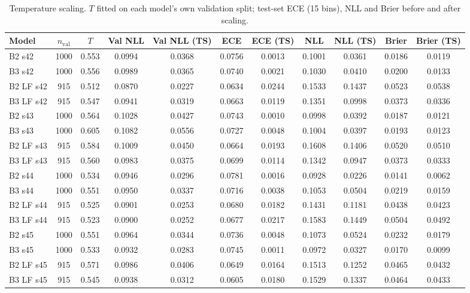 \begin{table}[!ht]
\centering
\scriptsize
\caption{Temperature scaling. $T$ fitted on each model's own validation split; test-set ECE (15 bins), NLL and Brier before and after scaling.}
\label{tab:s-calib}
\begin{tabular}{lcccccccccc}
\toprule
Model & $n_{\text{val}}$ & $T$ & Val NLL & Val NLL (TS) & ECE & ECE (TS) & NLL & NLL (TS) & Brier & Brier (TS) \\
\midrule
B2 s42 & 1000 & 0.553 & 0.0994 & 0.0368 & 0.0756 & 0.0013 & 0.1001 & 0.0361 & 0.0186 & 0.0119 \\
B3 s42 & 1000 & 0.556 & 0.0989 & 0.0365 & 0.0740 & 0.0021 & 0.1030 & 0.0410 & 0.0200 & 0.0133 \\
B2 LF s42 & 915 & 0.512 & 0.0870 & 0.0227 & 0.0634 & 0.0244 & 0.1533 & 0.1437 & 0.0523 & 0.0538 \\
B3 LF s42 & 915 & 0.547 & 0.0941 & 0.0319 & 0.0663 & 0.0119 & 0.1351 & 0.0998 & 0.0373 & 0.0336 \\
B2 s43 & 1000 & 0.564 & 0.1028 & 0.0427 & 0.0743 & 0.0010 & 0.0998 & 0.0392 & 0.0187 & 0.0121 \\
B3 s43 & 1000 & 0.605 & 0.1082 & 0.0556 & 0.0727 & 0.0048 & 0.1004 & 0.0397 & 0.0193 & 0.0123 \\
B2 LF s43 & 915 & 0.584 & 0.1009 & 0.0450 & 0.0664 & 0.0193 & 0.1608 & 0.1406 & 0.0520 & 0.0510 \\
B3 LF s43 & 915 & 0.560 & 0.0983 & 0.0375 & 0.0699 & 0.0114 & 0.1342 & 0.0947 & 0.0373 & 0.0333 \\
B2 s44 & 1000 & 0.534 & 0.0946 & 0.0296 & 0.0781 & 0.0016 & 0.0928 & 0.0226 & 0.0141 & 0.0062 \\
B3 s44 & 1000 & 0.551 & 0.0950 & 0.0337 & 0.0716 & 0.0038 & 0.1053 & 0.0504 & 0.0219 & 0.0159 \\
B2 LF s44 & 915 & 0.525 & 0.0901 & 0.0253 & 0.0680 & 0.0182 & 0.1431 & 0.1181 & 0.0438 & 0.0423 \\
B3 LF s44 & 915 & 0.523 & 0.0900 & 0.0252 & 0.0677 & 0.0217 & 0.1583 & 0.1449 & 0.0504 & 0.0492 \\
B2 s45 & 1000 & 0.551 & 0.0964 & 0.0344 & 0.0736 & 0.0048 & 0.1073 & 0.0524 & 0.0232 & 0.0179 \\
B3 s45 & 1000 & 0.533 & 0.0932 & 0.0283 & 0.0745 & 0.0011 & 0.0972 & 0.0327 & 0.0170 & 0.0099 \\
B2 LF s45 & 915 & 0.571 & 0.0986 & 0.0406 & 0.0649 & 0.0164 & 0.1513 & 0.1252 & 0.0465 & 0.0432 \\
B3 LF s45 & 915 & 0.545 & 0.0938 & 0.0312 & 0.0605 & 0.0180 & 0.1529 & 0.1337 & 0.0464 & 0.0433 \\

\end{tabular}
\end{table}
